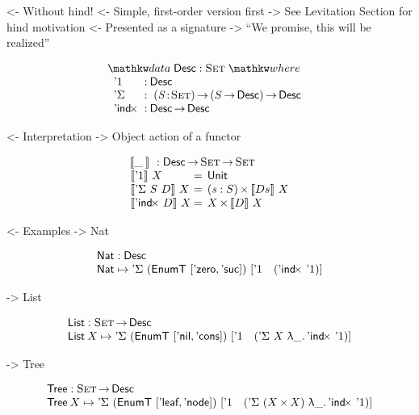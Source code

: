 \documentclass[preprint, authoryear]{sigplanconf}
\newenvironment{structure}{\footnotesize\verbatim}{\endverbatim}
\begin{document}
\begin{structure}
<- Without hind!
    <- Simple, first-order version first
    -> See Levitation Section for hind motivation
<- Presented as a signature
    -> ``We promise, this will be realized''
\end{structure}

\[
\stk{
\data \Desc : \Set \where \\
\;\;\begin{array}{@{}l@{\::\:}l@{\quad}l}
    \DUnit          & \Desc \\
    \DSigma         & \PI{\V{S}}{\Set} \PIS{S \To \Desc} \Desc \\
    \DIndx          & \Desc \To \Desc
\end{array}
}
\]

\begin{structure}
<- Interpretation
    -> Object action of a functor
\end{structure}


\[\stk{
\:\:\descop{\_\:}{} : \Desc \To \Set \To \Set \\
\begin{array}{l@{\:=\:\:}ll}
\descop{\DUnit}{X}        &  \Unit                                       \\
\descop{\DSigma{S}{D}}{X} &  \SIGMAS{\V{s} : S}{\descop{D s}{X}}         \\
\descop{\DIndx{D}}{X}     &  \TIMES{X}{\descop{D}{X}}
\end{array}
}\]

\begin{structure}
<- Examples
    -> Nat
\end{structure}

\[\stk{
\Nat : \Desc \\
\Nat \mapsto \DSigma{(\EnumT [ \NatZero, \NatSuc ])}
                    {[ \DUnit \quad (\DIndx{\DUnit}) ]}
}\]

\begin{structure}
    -> List
\end{structure}

\[\stk{
\List : \Set \To \Desc \\
\List \: X \mapsto \DSigma{(\EnumT [ \ListNil, \ListCons ])}
                       {[ \DUnit \quad (\DSigma{X}{\LAM{\_} \DIndx{\DUnit}}) ]}
}\]

\begin{structure}
    -> Tree
\end{structure}

\[\stk{
\Tree : \Set \To \Desc \\
\Tree \: X \mapsto \DSigma{(\EnumT [ \TreeLeaf, \TreeNode ])}
                          {[ \DUnit \quad (\DSigma{(\TIMES{X}{X})}{\LAM{\_} \DIndx{\DUnit}}) ]}
}\]
\end{document}
